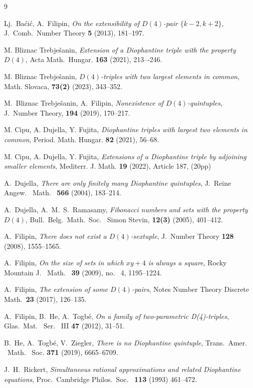 \documentclass[12pt]{amsart}%
\theoremstyle{definition}
\theoremstyle{remark}
\theoremstyle{plain}
\begin{document}
\begin{thebibliography}{9}

 Lj.~Ba\'{c}i\'{c}, A.~Filipin, {\it On the extensibility of $D(4)$-pair $\{k-2,k+2\}$}, {  J.~Comb.~Number Theory} \textbf{5} (2013), 181--197.

 M. Bliznac Trebješanin, {\it Extension of a Diophantine triple with the property $D(4)$}, {  Acta Math.~Hungar.} \textbf{163} (2021), 213–-246.

 M. Bliznac Trebješanin, {\it $D(4)$-triples with two largest elements in common}, Math. Slovaca, \textbf{73(2)} (2023), 343--352.

 M.~Bliznac Trebje\v{s}anin, A.~Filipin, {\it Nonexistence of $D(4)$-quintuples}, {  J.~Number Theory}, \textbf{194} (2019), 170--217.

 M. Cipu, A. Dujella, Y. Fujita, {\it Diophantine triples with largest two elements in common}, {  Period. Math. Hungar.} \textbf{82} (2021), 56--68.

 M. Cipu, A. Dujella, Y. Fujita, {\it Extensions of a Diophantine triple by adjoining smaller elements}, Mediterr. J. Math. \textbf{19} (2022), Article 187, (20pp)

 A.~Dujella, {\it There are only finitely many Diophantine quintuples}, {  J.~Reine Angew.~ Math.~} \textbf{566} (2004), 183--214.


 A.~Dujella, A.~M.~S.~Ramasamy, {\it Fibonacci numbers and sets with the property $D(4)$}, {  Bull.~Belg.~Math.~Soc.~ Simon Stevin}, \textbf{12(3)} (2005), 401--412.

 A.~Filipin, {\it There does not exist a $D(4)$-sextuple}, {  J.~Number Theory} \textbf{128} (2008), 1555--1565.

 A.~Filipin,{ \it On the size of sets in which $xy + 4$ is always a square}, {  Rocky Mountain J.~ Math.~} \textbf{39} (2009), no.~ 4, 1195--1224.

 A.~Filipin, {\it The extension of some $D(4)$-pairs}, {  Notes Number Theory Discrete Math.~}\textbf{23} (2017), 126--135.

 A.~Filipin, B.~He, A.~Togb\'{e}, {\it  On a family of two-parametric D(4)-triples}, {  Glas.~Mat.~ Ser.~ III} \textbf{47} (2012), 31--51.

 B.~He, A.~Togb\'{e}, V.~Ziegler, {\it There is no Diophantine quintuple},   Trans.~Amer. ~Math. ~Soc. \textbf{371} (2019), 6665--6709.
 

 J.~H.~Rickert, {\it Simultaneous rational approximations and related Diophantine equations}, {  Proc.~Cambridge Philos.~Soc.~} \textbf{113} (1993) 461--472.

\end{thebibliography}
\end{document}
